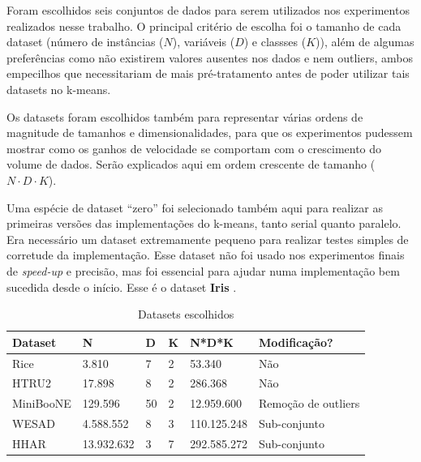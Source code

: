 \documentclass[12pt,
openright, 
oneside, %
a4paper,    %
brazil]{facom-ufu-abntex2}
\begin{document}
Foram escolhidos seis conjuntos de dados para serem utilizados nos experimentos realizados nesse trabalho. O principal critério de escolha foi o tamanho de cada dataset (número de instâncias ($N$), variáveis ($D$) e classses ($K$)), além de algumas preferências como não existirem valores ausentes nos dados e nem outliers, ambos empecilhos que necessitariam de mais pré-tratamento antes de poder utilizar tais datasets no k-means.

Os datasets foram escolhidos também para representar várias ordens de magnitude de tamanhos e dimensionalidades, para que os experimentos pudessem mostrar como os ganhos de velocidade se comportam com o crescimento do volume de dados. Serão explicados aqui em ordem crescente de tamanho ($N \cdot D \cdot K$).

Uma espécie de dataset \enquote{zero} foi selecionado também aqui para realizar as primeiras versões das implementações do k-means, tanto serial quanto paralelo. Era necessário um dataset extremamente pequeno para realizar testes simples de corretude da implementação. Esse dataset não foi usado nos experimentos finais de \textit{speed-up} e precisão, mas foi essencial para ajudar numa implementação bem sucedida desde o início. Esse é o dataset \textbf{Iris} \cite{irisDataset}.






\begin{table}[h]
  \centering
  \caption{Datasets escolhidos}
  \label{tab:datasetsEscolhidos}
  \begin{tabular}{|l|l|l|l|l|l|}
  \hline
  \rowcolor[HTML]{9B9B9B} 
  \textbf{Dataset} & \textbf{N} & \textbf{D} & \textbf{K} & \textbf{N*D*K} & \textbf{Modificação?} \\ \hline
  Rice             & 3.810      & 7          & 2          & 53.340         & Não                   \\ \hline
  HTRU2            & 17.898     & 8          & 2          & 286.368        & Não                   \\ \hline
  MiniBooNE        & 129.596    & 50         & 2          & 12.959.600     & Remoção de outliers   \\ \hline
  WESAD            & 4.588.552  & 8          & 3          & 110.125.248    & Sub-conjunto          \\ \hline
  HHAR             & 13.932.632 & 3          & 7          & 292.585.272    & Sub-conjunto          \\ \hline
  \end{tabular}
\end{table}
\end{document}

